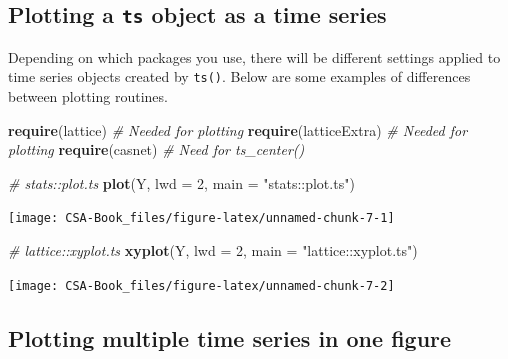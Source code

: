 \documentclass[12pt,]{book}
\newenvironment{Shaded}{\begin{snugshade}}{\end{snugshade}}
\newcommand{\CommentTok}[1]{\textcolor[rgb]{0.56,0.35,0.01}{\textit{#1}}}
\newcommand{\DataTypeTok}[1]{\textcolor[rgb]{0.13,0.29,0.53}{#1}}
\newcommand{\DecValTok}[1]{\textcolor[rgb]{0.00,0.00,0.81}{#1}}
\newcommand{\KeywordTok}[1]{\textcolor[rgb]{0.13,0.29,0.53}{\textbf{#1}}}
\newcommand{\NormalTok}[1]{#1}
\newcommand{\StringTok}[1]{\textcolor[rgb]{0.31,0.60,0.02}{#1}}
\begin{document}
\hypertarget{plotting-a-ts-object-as-a-time-series}{%
\subsection{\texorpdfstring{Plotting a \texttt{ts} object as a time series}{Plotting a ts object as a time series}}\label{plotting-a-ts-object-as-a-time-series}}

Depending on which packages you use, there will be different settings applied to time series objects created by \texttt{ts()}. Below are some examples of differences between plotting routines.

\begin{Shaded}
\begin{Highlighting}[]
\KeywordTok{require}\NormalTok{(lattice)       }\CommentTok{# Needed for plotting}
\KeywordTok{require}\NormalTok{(latticeExtra)  }\CommentTok{# Needed for plotting}
\KeywordTok{require}\NormalTok{(casnet)        }\CommentTok{# Need for ts_center()}

\CommentTok{# stats::plot.ts}
\KeywordTok{plot}\NormalTok{(Y, }\DataTypeTok{lwd =} \DecValTok{2}\NormalTok{, }\DataTypeTok{main =} \StringTok{"stats::plot.ts"}\NormalTok{)}
\end{Highlighting}
\end{Shaded}

\begin{center}\texttt{[image: CSA-Book\_files/figure-latex/unnamed-chunk-7-1]} \end{center}

\begin{Shaded}
\begin{Highlighting}[]
\CommentTok{# lattice::xyplot.ts}
\KeywordTok{xyplot}\NormalTok{(Y, }\DataTypeTok{lwd =} \DecValTok{2}\NormalTok{, }\DataTypeTok{main =} \StringTok{"lattice::xyplot.ts"}\NormalTok{)}
\end{Highlighting}
\end{Shaded}

\begin{center}\texttt{[image: CSA-Book\_files/figure-latex/unnamed-chunk-7-2]} \end{center}

\hypertarget{plotting-multiple-time-series-in-one-figure}{%
\subsection{Plotting multiple time series in one figure}\label{plotting-multiple-time-series-in-one-figure}}
\end{document}
